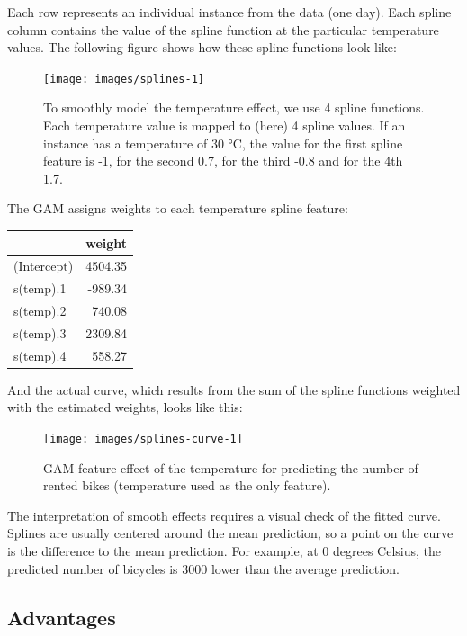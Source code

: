 \documentclass[
  12pt,
]{krantz}
\begin{document}
Each row represents an individual instance from the data (one day).
Each spline column contains the value of the spline function at the particular temperature values.
The following figure shows how these spline functions look like:

\begin{figure}

{\centering \texttt{[image: images/splines-1]} 

}

\caption{To smoothly model the temperature effect, we use 4 spline functions. Each temperature value is mapped to (here) 4 spline values. If an instance has a temperature of 30 °C, the value for the first spline feature is -1, for the second 0.7, for the third -0.8 and for the 4th 1.7.}\label{fig:splines}
\end{figure}

The GAM assigns weights to each temperature spline feature:

\begin{tabular}{l|r}
\hline
  & weight\\
\hline
(Intercept) & 4504.35\\
\hline
s(temp).1 & -989.34\\
\hline
s(temp).2 & 740.08\\
\hline
s(temp).3 & 2309.84\\
\hline
s(temp).4 & 558.27\\
\hline
\end{tabular}

And the actual curve, which results from the sum of the spline functions weighted with the estimated weights, looks like this:

\begin{figure}

{\centering \texttt{[image: images/splines-curve-1]} 

}

\caption{GAM feature effect of the temperature for predicting the number of rented bikes (temperature used as the only feature).}\label{fig:splines-curve}
\end{figure}

The interpretation of smooth effects requires a visual check of the fitted curve.
Splines are usually centered around the mean prediction, so a point on the curve is the difference to the mean prediction.
For example, at 0 degrees Celsius, the predicted number of bicycles is 3000 lower than the average prediction.

\hypertarget{advantages-1}{%
\subsection{Advantages}\label{advantages-1}}
\end{document}
